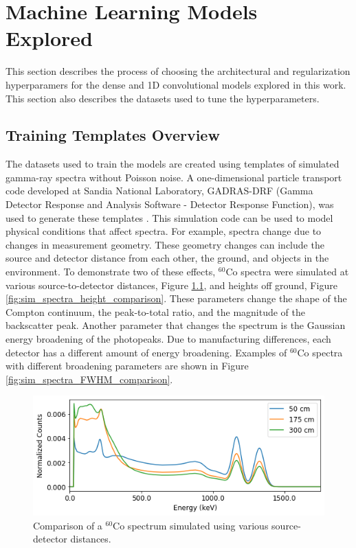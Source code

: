 \chapter{Machine Learning Models Explored} \label{ChapterMachineLearningModelsExplored}

This section describes the process of choosing the architectural and regularization hyperparamers for the dense and 1D convolutional models explored in this work. This section also describes the datasets used to tune the hyperparameters.



\section{Training Templates Overview}

The datasets used to train the models are created using templates of simulated gamma-ray spectra without Poisson noise. A one-dimensional particle transport code developed at Sandia National Laboratory, GADRAS-DRF (Gamma Detector Response and Analysis Software - Detector Response Function), was used to generate these templates \cite{mitchell2014}. This simulation code can be used to model physical conditions that affect spectra. For example, spectra change due to changes in measurement geometry. These geometry changes can include the source and detector distance from each other, the ground, and objects in the environment. To demonstrate two of these effects, $^{60}$Co spectra were simulated at various source-to-detector distances, Figure \ref{fig:sim_spectra_distance_comparison}, and heights off ground, Figure \ref{fig:sim_spectra_height_comparison}. These parameters change the shape of the Compton continuum, the peak-to-total ratio, and the magnitude of the backscatter peak. Another parameter that changes the spectrum is the Gaussian energy broadening of the photopeaks. Due to manufacturing differences, each detector has a different amount of energy broadening. Examples of $^{60}$Co spectra with different broadening parameters are shown in Figure \ref{fig:sim_spectra_FWHM_comparison}.


\begin{figure}[H]
\centering
\includegraphics[width=0.75\linewidth]{images/sim_spectra_distance_comparison}
\caption{Comparison of a $^{60}$Co spectrum simulated using various source-detector distances.}
\label{fig:sim_spectra_distance_comparison}
\end{figure}

